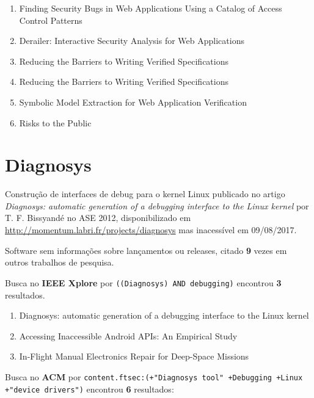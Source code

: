 \begin{enumerate}
\item Finding Security Bugs in Web Applications Using a Catalog of Access Control Patterns
\item Derailer: Interactive Security Analysis for Web Applications
\item Reducing the Barriers to Writing Verified Specifications
\item Reducing the Barriers to Writing Verified Specifications
\item Symbolic Model Extraction for Web Application Verification
\item Risks to the Public
\end{enumerate}

\section{Diagnosys}

Construção de interfaces de debug para o kernel Linux
publicado no artigo {\it Diagnosys: automatic generation of a debugging interface to the Linux kernel}
por T. F. Bissyandé
no ASE 2012,
disponibilizado em \url{http://momentum.labri.fr/projects/diagnosys}
mas inacessível em 09/08/2017.

Software sem informações sobre lançamentos ou releases,
citado {\bf 9} vezes em outros trabalhos de pesquisa.

Busca no {\bf IEEE Xplore} por
\texttt{((Diagnosys) AND debugging)}
encontrou {\bf 3}
resultados.

\begin{enumerate}
\item Diagnosys: automatic generation of a debugging interface to the Linux kernel
\item Accessing Inaccessible Android APIs: An Empirical Study
\item In-Flight Manual Electronics Repair for Deep-Space Missions
\end{enumerate}

Busca no {\bf ACM} por
\texttt{content.ftsec:(+"Diagnosys tool" +Debugging +Linux +"device drivers")}
encontrou {\bf 6}
resultados:

